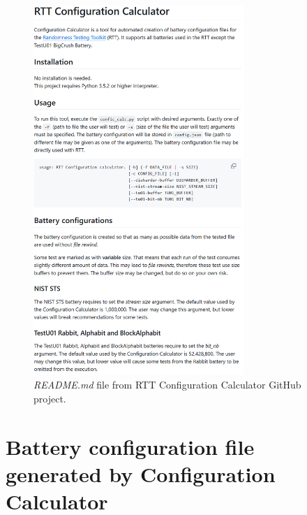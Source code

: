 \documentclass[
  digital,     %
  oneside,     %
  nosansbold,  %
  nocolorbold, %
  nolof,         %
  nolot,         %
]{fithesis4}
\begin{document}
\begin{figure}[h!]
  \begin{center}
    \includegraphics[width=8cm]{figures/config_calc/readme.png}
  \end{center}
  \caption{\emph{README.md} file from RTT Configuration Calculator GitHub project. }
  \label{fig:cc_readme}
\end{figure}



\newpage
\section{Battery configuration file generated by Configuration Calculator} \label{append:cc_config}
\end{document}
